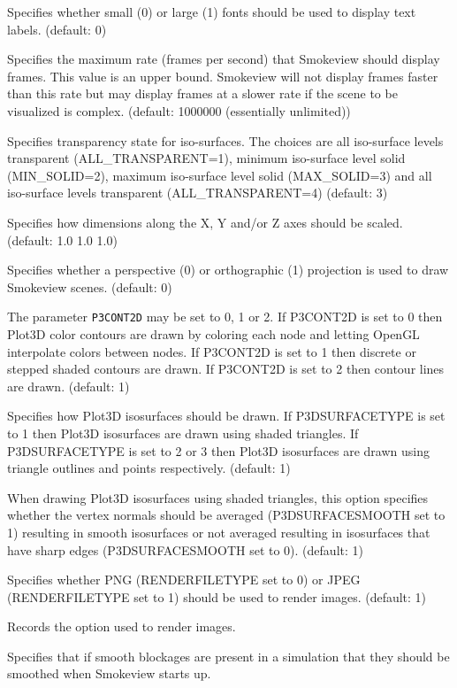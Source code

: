 \documentclass[11pt,twoside]{book}
\newcommand{\hitem}[1]{\item[{\bf #1} \hfill]}
\begin{document}
\hitem{FONTSIZE} Specifies whether small (0) or large (1)
fonts should be used to display text labels. (default: 0)

\hitem{FRAMERATEVALUE}Specifies the maximum rate (frames per
second) that Smokeview should display frames. This value is an
upper bound.  Smokeview will not display frames faster than this
rate but may display frames at a slower rate if the scene to be
visualized is complex. (default: 1000000 (essentially unlimited))

\hitem{ISOTRANS}Specifies transparency state for iso-surfaces. The choices
are all iso-surface levels transparent (ALL\_TRANSPARENT=1), minimum
iso-surface level solid (MIN\_SOLID=2), maximum iso-surface level solid (MAX\_SOLID=3)
and all iso-surface levels transparent (ALL\_TRANSPARENT=4) (default: 3)

\hitem{MSCALE} Specifies how dimensions along the X, Y
and/or Z axes should be scaled. (default: 1.0 1.0 1.0)

\hitem{PROJECTION} Specifies whether a perspective (0) or orthographic (1) projection
is used to draw Smokeview scenes.
(default: 0)

\hitem{P3CONT2D}The parameter {\tt P3CONT2D} may be set to 0, 1 or
2.  If P3CONT2D is set to 0 then Plot3D color contours are drawn
by coloring each node and letting OpenGL interpolate colors
between nodes.  If P3CONT2D is set to 1 then discrete or stepped
shaded contours are drawn.  If P3CONT2D is set to 2 then contour
lines are drawn. (default: 1)

\hitem{P3DSURFACETYPE}Specifies how Plot3D isosurfaces should be
drawn.  If P3DSURFACETYPE is set to 1 then Plot3D isosurfaces are
drawn using shaded triangles.  If P3DSURFACETYPE is set to 2 or 3
then Plot3D isosurfaces are drawn using triangle outlines and
points respectively. (default: 1)

\hitem{P3DSURFACESMOOTH}When drawing Plot3D isosurfaces using
shaded triangles, this option specifies whether the vertex normals
should be averaged (P3DSURFACESMOOTH set to 1) resulting in smooth
isosurfaces or not averaged resulting in isosurfaces that have
sharp edges (P3DSURFACESMOOTH set to 0). (default: 1)

\hitem{RENDERFILETYPE}Specifies whether PNG (RENDERFILETYPE set to 0) or JPEG (RENDERFILETYPE set to 1)
should be used to render images.  (default: 1)

\hitem{RENDEROPTION} Records the option used to render images.

\hitem{SBATSTART} Specifies that if smooth blockages are present in a simulation that they should be
smoothed when Smokeview starts up.
\end{document}
